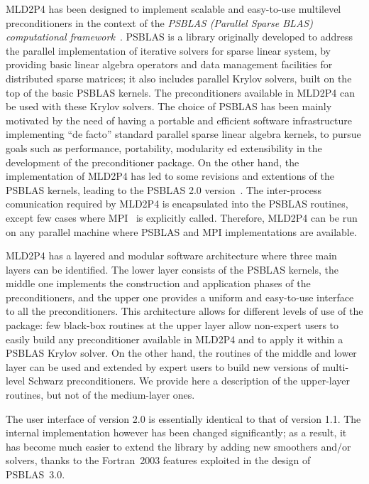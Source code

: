 MLD2P4 has been designed to implement scalable and easy-to-use
multilevel preconditioners in the context of the \emph{PSBLAS
  (Parallel Sparse BLAS) computational framework}~\cite{psblas_00,PSBLAS3}. 
PSBLAS is a library originally developed to address the parallel implementation of
iterative solvers for sparse linear system, by providing basic linear algebra
operators and data management facilities for distributed sparse matrices; it
also includes parallel Krylov solvers, built on the top of the basic PSBLAS kernels.
The preconditioners available in MLD2P4 can be used with these Krylov solvers.
The choice of PSBLAS has been mainly motivated by the need of having
a portable and efficient software infrastructure implementing ``de facto'' standard
parallel sparse linear algebra kernels, to pursue goals such as performance,
portability, modularity ed extensibility in the development of the preconditioner
package. On the other hand, the implementation of MLD2P4 has led to some
revisions and extentions of the PSBLAS kernels, leading to the
 PSBLAS 2.0 version~\cite{PSBLASGUIDE}. The inter-process comunication required
by MLD2P4 is encapsulated into the PSBLAS routines, except few cases where
MPI~\cite{MPI1} is explicitly called. Therefore, MLD2P4 can be run on any parallel
machine where PSBLAS and MPI implementations are available.

MLD2P4 has a layered and modular software architecture where three main layers can be identified. 
The lower layer consists of the PSBLAS kernels, the middle one implements
the construction and application phases of the preconditioners, and the upper one
provides a uniform and easy-to-use interface to all the preconditioners. 
This architecture allows for different levels of use of the package:
few black-box routines at the upper layer allow non-expert users to easily
build any preconditioner available in MLD2P4 and to apply it within a PSBLAS Krylov solver.
On the other hand, the routines of the middle and lower layer can be used and extended
by expert users to build new versions of multi-level Schwarz preconditioners.
We provide here a description of the upper-layer routines, but not of the
medium-layer ones.%

The user interface of version 2.0 is essentially identical to that of
version 1.1.  The internal implementation however has been changed
significantly; as a result, it has become much easier to extend the library by
adding new smoothers and/or solvers, thanks to the Fortran~2003 features
exploited in the design of PSBLAS~3.0. 


